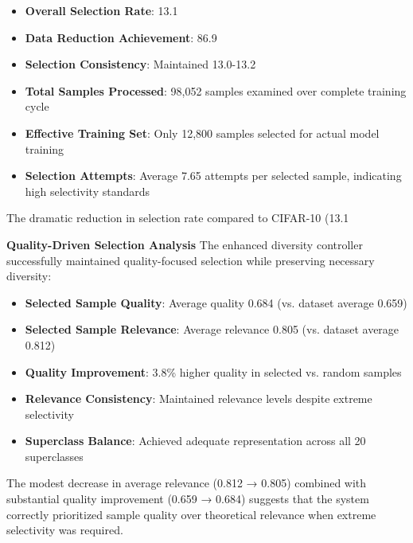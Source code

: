 \documentclass[12pt]{article}
\begin{document}
\begin{itemize}
\item \textbf{Overall Selection Rate}: 13.1%
\item \textbf{Data Reduction Achievement}: 86.9%
\item \textbf{Selection Consistency}: Maintained 13.0-13.2%
\item \textbf{Total Samples Processed}: 98,052 samples examined over complete training cycle
\item \textbf{Effective Training Set}: Only 12,800 samples selected for actual model training
\item \textbf{Selection Attempts}: Average 7.65 attempts per selected sample, indicating high selectivity standards
\end{itemize}

The dramatic reduction in selection rate compared to CIFAR-10 (13.1%

\textbf{Quality-Driven Selection Analysis}
The enhanced diversity controller successfully maintained quality-focused selection while preserving necessary diversity:

\begin{itemize}
\item \textbf{Selected Sample Quality}: Average quality 0.684 (vs. dataset average 0.659)
\item \textbf{Selected Sample Relevance}: Average relevance 0.805 (vs. dataset average 0.812)
\item \textbf{Quality Improvement}: 3.8\% higher quality in selected vs. random samples
\item \textbf{Relevance Consistency}: Maintained relevance levels despite extreme selectivity
\item \textbf{Superclass Balance}: Achieved adequate representation across all 20 superclasses
\end{itemize}

The modest decrease in average relevance (0.812 → 0.805) combined with substantial quality improvement (0.659 → 0.684) suggests that the system correctly prioritized sample quality over theoretical relevance when extreme selectivity was required.
\end{document}
